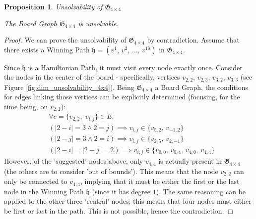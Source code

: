 \documentclass[conference]{IEEEtran}
\newtheorem{proposition}{Proposition}[section]
\begin{document}
\begin{proposition}{Unsolvability of $\mathfrak{G}_{4 \times 4}$}{}
\label{prop:unsolvability_4x4}

The Board Graph $\mathfrak{G}_{4 \times 4}$ is unsolvable.
\end{proposition}
\begin{proof}
We can prove the unsolvability of $\mathfrak{G}_{4 \times 4}$ by contradiction. Assume that there exists a Winning Path $\mathfrak{h} = (v^1,\,v^2,\,\dots,\,v^{16})$ in $\mathfrak{G}_{4 \times 4}$. 

Since $\mathfrak{h}$ is a Hamiltonian Path, it must visit every node exactly once.
Consider the nodes in the center of the board - specifically, vertices $v_{2,2},\,v_{2,3},\,v_{3,2},\,v_{3,3}$ (see Figure \ref{fig:dim_unsolvability_4x4}).
Being $\mathfrak{G}_{4 \times 4}$ a Board Graph, the conditions for edges linking those vertices can be explicitly determined (focusing, for the time being, on $v_{2,2}$):
\begin{align*}
    &\forall e = \{v_{2,2},\;v_{i,j}\} \in E,\\
    &(|2 - i| = 3 \land 2 = j) \implies v_{i,j} \in \{v_{5,2},\,v_{-1,2}\}\\
    &(|2 - j| = 3 \land 2 = i) \implies v_{i,j} \in \{v_{2,5},\,v_{2,-1}\}\\
    &(|2 - i| = |2 - j| = 2) \implies v_{i,j} \in \{v_{0,0},\,v_{0,4},\,v_{4,0},\,v_{4,4}\}
\end{align*}
However, of the 'suggested' nodes above, only $v_{4,4}$ is actually present in $\mathfrak{G}_{4 \times 4}$ (the others are to consider 'out of bounds').
This means that the node $v_{2,2}$ can only be connected to $v_{4,4}$, implying that it must be either the first or the last node in the Winning Path $\mathfrak{h}$ (since it has degree $1$).
The same reasoning can be applied to the other three 'central' nodes; this means that four nodes must either be first or last in the path. This is not possible, hence the contradiction.

\end{proof}
\end{document}
